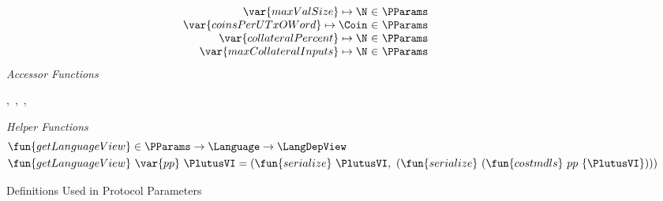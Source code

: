 \begin{figure*}[htb]
\begin{equation*}
\begin{array}{r@{~\in~}l@{\qquad}r}
        \var{maxValSize} \mapsto \N & \PParams \\
        \var{coinsPerUTxOWord} \mapsto \Coin & \PParams \\
        \var{collateralPercent} \mapsto \N & \PParams \\
        \var{maxCollateralInputs} \mapsto \N & \PParams \\
      \end{array}
  \end{equation*}
  \emph{Accessor Functions}
  \begin{center}
  ,~,~,~
  \end{center}
  \emph{Helper Functions}
  \begin{align*}
    & \fun{getLanguageView} \in \PParams \to \Language \to \LangDepView \\
    & \fun{getLanguageView}~\var{pp}~\PlutusVI = (\fun{serialize}~\PlutusVI, ~ (\fun{serialize}~(\fun{costmdls}~{pp}~\{\PlutusVI\})))
  \end{align*}
  \caption{Definitions Used in Protocol Parameters}
  \label{fig:defs:protocol-parameters}
\end{figure*}
